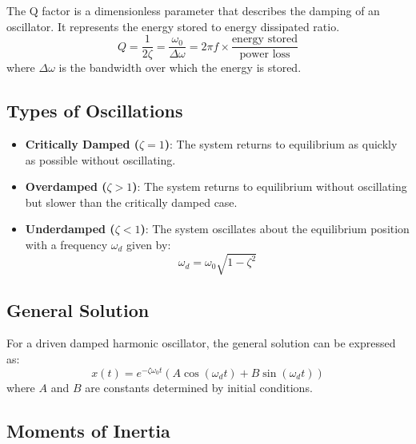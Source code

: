 \documentclass[12pt,a4paper]{article}
\begin{document}
	The Q factor is a dimensionless parameter that describes the damping of an oscillator. It represents the energy stored to energy dissipated ratio. 
	\[
	Q = \frac{1}{2\zeta} = \frac{\omega_0}{\Delta \omega} = 2 \pi f \times \frac{\text{energy stored}}{\text{power loss}}
	\]
	where \( \Delta \omega \) is the bandwidth over which the energy is stored.
	
	\subsection*{Types of Oscillations}
	
	\begin{itemize}
		\item \textbf{Critically Damped (\( \zeta = 1 \))}: The system returns to equilibrium as quickly as possible without oscillating.
		\item \textbf{Overdamped (\( \zeta > 1 \))}: The system returns to equilibrium without oscillating but slower than the critically damped case.
		\item \textbf{Underdamped (\( \zeta < 1 \))}: The system oscillates about the equilibrium position with a frequency \( \omega_d \) given by:
		\[
		\omega_d = \omega_0 \sqrt{1 - \zeta^2}
		\]
	\end{itemize}
	
	\subsection*{General Solution}
	
	For a driven damped harmonic oscillator, the general solution can be expressed as:
	\[
	x(t) = e^{-\zeta \omega_0 t} \left( A \cos(\omega_d t) + B \sin(\omega_d t) \right)
	\]
	where \( A \) and \( B \) are constants determined by initial conditions.
	
\subsection*{Moments of Inertia}
\end{document}
